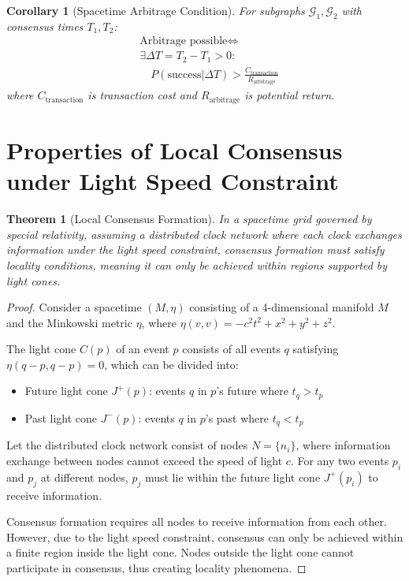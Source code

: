 \documentclass{article}
\newtheorem{theorem}{Theorem}
\newtheorem{corollary}{Corollary}
\begin{document}
\begin{corollary}[Spacetime Arbitrage Condition]
For subgraphs $\mathcal{G}_1, \mathcal{G}_2$ with consensus times $T_1, T_2$:
\begin{align*}
    &\text{Arbitrage possible} \iff \\
    &\exists \Delta T = T_2 - T_1 > 0 : \\
    &\quad P(\text{success}|\Delta T) > \frac{C_{\text{transaction}}}{R_{\text{arbitrage}}}
\end{align*}
where $C_{\text{transaction}}$ is transaction cost and $R_{\text{arbitrage}}$ is potential return.
\end{corollary}

\section{Properties of Local Consensus under Light Speed Constraint}

\begin{theorem}[Local Consensus Formation]
In a spacetime grid governed by special relativity, assuming a distributed clock network where each clock exchanges information under the light speed constraint, consensus formation must satisfy locality conditions, meaning it can only be achieved within regions supported by light cones.
\end{theorem}

\begin{proof}
Consider a spacetime $(M, \eta)$ consisting of a 4-dimensional manifold $M$ and the Minkowski metric $\eta$, where $\eta(v, v) = -c^2t^2 + x^2 + y^2 + z^2$.

The light cone $C(p)$ of an event $p$ consists of all events $q$ satisfying $\eta(q-p,q-p)=0$, which can be divided into:
\begin{itemize}
    \item Future light cone $J^+(p)$: events $q$ in $p$'s future where $t_q > t_p$
    \item Past light cone $J^-(p)$: events $q$ in $p$'s past where $t_q < t_p$
\end{itemize}

Let the distributed clock network consist of nodes $N = \{n_i\}$, where information exchange between nodes cannot exceed the speed of light $c$. For any two events $p_i$ and $p_j$ at different nodes, $p_j$ must lie within the future light cone $J^+(p_i)$ to receive information.

Consensus formation requires all nodes to receive information from each other. However, due to the light speed constraint, consensus can only be achieved within a finite region inside the light cone. Nodes outside the light cone cannot participate in consensus, thus creating locality phenomena.
\end{proof}
\end{document}
